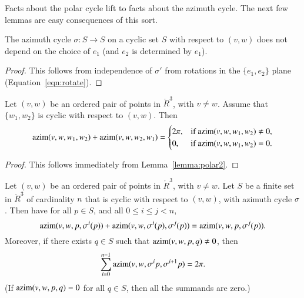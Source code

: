 Facts about the polar cycle lift to facts about the azimuth cycle.
The next few lemmas are easy consequences of this sort.


\begin{lemma} The azimuth cycle $\sigma:S\to S$ on
a cyclic set $S$ with respect to $(v,w)$ does not depend
on the choice of $e_1$ (and $e_2$ is determined by $e_1$).
\end{lemma}

\begin{proof} This follows from independence of $\sigma'$ from
rotations in the $\{e_1,e_2\}$ plane  (Equation~\ref{eqn:rotate}).
\end{proof}


\begin{lemma} 
Let $(v,w)$ be an ordered pair of points in $\ring{R}^3$,
with $v\ne w$.  Assume that $\{w_1,w_2\}$ is cyclic
with respect to $(v,w)$.  Then
  $$
  {\operatorname{azim}}(v,w,w_1,w_2) + {\operatorname{azim}}(v,w,w_2,w_1) 
  = \begin{cases} 2\pi, & \text{if }{\operatorname{azim}}(v,w,w_1,w_2)\ne 0,\\
    0, & \text{if }{\operatorname{azim}}(v,w,w_1,w_2)=0.
    \end{cases}
    $$
\end{lemma}

\begin{proof} This follows immediately from Lemma~\ref{lemma:polar2}.
\end{proof}

\begin{lemma} \label{lemma:2pi-sum}
Let $(v,w)$ be an ordered pair of points in $\ring{R}^3$,
with $v\ne w$.  Let $S$ be a finite set in $\ring{R}^3$ of
cardinality $n$ that
is cyclic with respect to $(v,w)$,
with azimuth cycle $\sigma$.
Then have for all $p\in S$,
and all $0\le i \le j < n$,
   $$
   {\operatorname{azim}}(v,w,p,\sigma^i(p)) +
    {\operatorname{azim}}(v,w,\sigma^i(p),\sigma^j(p)) =
   {\operatorname{azim}}(v,w,p,\sigma^j(p)).
   $$
Moreover, if there exists $q\in S$ such that 
${\operatorname{azim}}(v,w,p,q)\ne0$,
then
  $$
  \sum_{i=0}^{n-1} {\operatorname{azim}}(v,w,\sigma^ip,\sigma^{i+1}p) = 2\pi.
  $$
(If ${\operatorname{azim}}(v,w,p,q)=0$ for all $q\in S$, then all the
summands are zero.)
\end{lemma}

